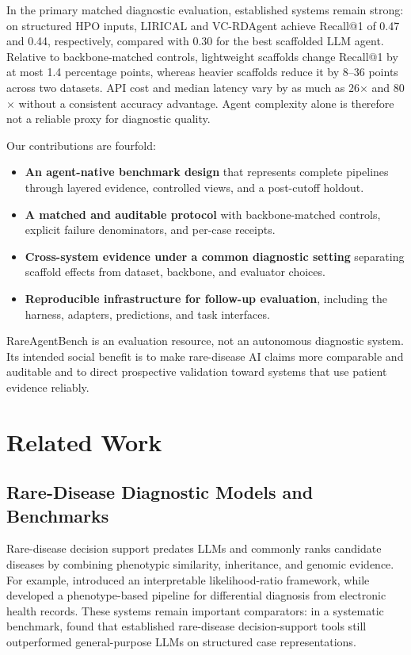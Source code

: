 \documentclass[letterpaper]{article} %
\begin{document}
In the primary matched diagnostic evaluation, established systems remain
strong: on structured HPO inputs, LIRICAL and VC-RDAgent achieve Recall@1 of
0.47 and 0.44, respectively, compared with 0.30 for the best scaffolded LLM
agent. Relative to backbone-matched controls, lightweight scaffolds change
Recall@1 by at most 1.4 percentage points, whereas heavier scaffolds reduce
it by 8--36 points across two datasets. API cost and median latency vary by
as much as 26$\times$ and 80$\times$ without a consistent accuracy
advantage. Agent complexity alone is therefore not a reliable proxy for
diagnostic quality.

Our contributions are fourfold:
\begin{itemize}
  \item \textbf{An agent-native benchmark design} that represents complete
  pipelines through layered evidence, controlled views, and a post-cutoff
  holdout.
  \item \textbf{A matched and auditable protocol} with backbone-matched
  controls, explicit failure denominators, and per-case receipts.
  \item \textbf{Cross-system evidence under a common diagnostic setting}
  separating scaffold effects from dataset, backbone, and evaluator choices.
  \item \textbf{Reproducible infrastructure for follow-up evaluation},
  including the harness, adapters, predictions, and task interfaces.
\end{itemize}

RareAgentBench is an evaluation resource, not an autonomous diagnostic
system. Its intended social benefit is to make rare-disease AI claims more
comparable and auditable and to direct prospective validation toward systems
that use patient evidence reliably.
\section{Related Work}
\label{sec:related-work}

\subsection{Rare-Disease Diagnostic Models and Benchmarks}

Rare-disease decision support predates LLMs and commonly ranks candidate
diseases by combining phenotypic similarity, inheritance, and genomic
evidence. For example, \citet{robinson2020lirical} introduced an interpretable
likelihood-ratio framework, while \citet{mao2025phenobrain} developed a
phenotype-based pipeline for differential diagnosis from electronic health
records. These systems remain important comparators: in a systematic
benchmark, \citet{reese2026systematic} found that established rare-disease
decision-support tools still outperformed general-purpose LLMs on structured
case representations.
\end{document}
